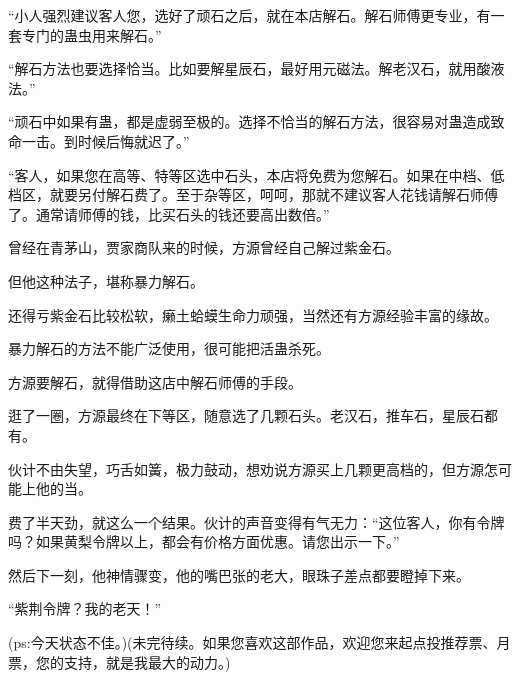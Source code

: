 \begin{this_body}
“小人强烈建议客人您，选好了顽石之后，就在本店解石。解石师傅更专业，有一套专门的蛊虫用来解石。”

“解石方法也要选择恰当。比如要解星辰石，最好用元磁法。解老汉石，就用酸液法。”

“顽石中如果有蛊，都是虚弱至极的。选择不恰当的解石方法，很容易对蛊造成致命一击。到时候后悔就迟了。”

“客人，如果您在高等、特等区选中石头，本店将免费为您解石。如果在中档、低档区，就要另付解石费了。至于杂等区，呵呵，那就不建议客人花钱请解石师傅了。通常请师傅的钱，比买石头的钱还要高出数倍。”

曾经在青茅山，贾家商队来的时候，方源曾经自己解过紫金石。

但他这种法子，堪称暴力解石。

还得亏紫金石比较松软，癞土蛤蟆生命力顽强，当然还有方源经验丰富的缘故。

暴力解石的方法不能广泛使用，很可能把活蛊杀死。

方源要解石，就得借助这店中解石师傅的手段。

逛了一圈，方源最终在下等区，随意选了几颗石头。老汉石，推车石，星辰石都有。

伙计不由失望，巧舌如簧，极力鼓动，想劝说方源买上几颗更高档的，但方源怎可能上他的当。

费了半天劲，就这么一个结果。伙计的声音变得有气无力：“这位客人，你有令牌吗？如果黄梨令牌以上，都会有价格方面优惠。请您出示一下。”

然后下一刻，他神情骤变，他的嘴巴张的老大，眼珠子差点都要瞪掉下来。

“紫荆令牌？我的老天！”

(ps:今天状态不佳。)(未完待续。如果您喜欢这部作品，欢迎您来起点投推荐票、月票，您的支持，就是我最大的动力。)

\end{this_body}

